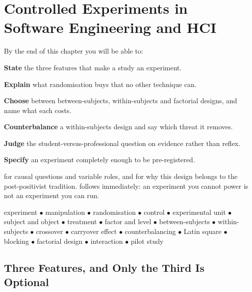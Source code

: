 \chapter{Controlled Experiments in Software Engineering and HCI}\label{ch:experiments}

\begin{outcomes}
By the end of this chapter you will be able to:
\begin{tight}
  \item \textbf{State} the three features that make a study an experiment.
  \item \textbf{Explain} what randomisation buys that no other technique can.
  \item \textbf{Choose} between between-subjects, within-subjects and factorial
    designs, and name what each costs.
  \item \textbf{Counterbalance} a within-subjects design and say which threat
    it removes.
  \item \textbf{Judge} the student-versus-professional question on evidence
    rather than reflex.
  \item \textbf{Specify} an experiment completely enough to be pre-registered.
\end{tight}
\end{outcomes}

\begin{prereq}
 for causal questions and variable roles, and
 for why this design belongs to the post-positivist
tradition.  follows immediately: an experiment you cannot
power is not an experiment you can run.
\end{prereq}

\begin{keyterms}
experiment $\bullet$ manipulation $\bullet$ randomisation $\bullet$ control
$\bullet$ experimental unit $\bullet$ subject and object $\bullet$ treatment
$\bullet$ factor and level $\bullet$ between-subjects $\bullet$
within-subjects $\bullet$ crossover $\bullet$ carryover effect $\bullet$
counterbalancing $\bullet$ Latin square $\bullet$ blocking $\bullet$ factorial
design $\bullet$ interaction $\bullet$ pilot study
\end{keyterms}

\section{Three Features, and Only the Third Is Optional}

